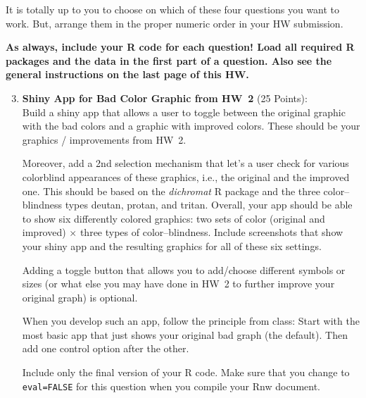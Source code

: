 \documentclass[12pt,letterpaper,final]{article}
\begin{document}
It is totally up to you to choose on which of these four questions
you want to work. But, arrange them in the proper numeric order in your HW submission.

{\bf As always, include your R code for each question! 
Load all required R packages and the data in the first part of a question.
Also see the general instructions on the last page of this HW.}


\begin{enumerate}

\setcounter{enumi}{2}

\item {\bf Shiny App for Bad Color Graphic from HW~2} (25 Points): \\
Build a shiny app that allows a user to toggle between
the original graphic with the bad colors and a graphic with improved colors.
These should be your graphics / improvements from HW~2.

Moreover, add a 2nd selection mechanism that let's a user check for various
colorblind appearances of these graphics, i.e., the original and the improved one.
This should be based on the {\it dichromat} R package and the three
color--blindness types deutan, protan, and tritan.
Overall, your app should be able to show six differently colored graphics:
two sets of color (original and improved) $\times$ three types of color--blindness.
Include screenshots that show your shiny app and the resulting graphics
for all of these six settings.

Adding a toggle button that allows you to add/choose different symbols
or sizes (or what else you may have done in HW~2 to further improve
your original graph) is optional.

When you develop such an app, follow the principle from class:
Start with the most basic app that just shows your original bad graph
(the default). Then add one control option after the other.

Include only the final version of your R code. Make sure
that you change to \verb|eval=FALSE| for this question
when you compile your Rnw document.


\end{enumerate}
\end{document}
